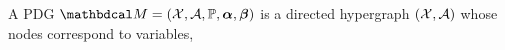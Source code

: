 \documentclass{article}
\newcommand\vjoe[1]{{\color{joecolor}\textbf{$\boldsymbol\{$Joe: }#1 \textbf{$\boldsymbol\}$}}}
\newcommand\voli[1]{{\color{olicolor}\textbf{$\boldsymbol\{$Oli: }#1 \textbf{$\boldsymbol\}$}}}
\begin{document}
\begin{defn}
    A PDG $\dg M = (\X, \Ar,
        \mathbb P, 
        \balpha, \bbeta )
    $
    is     
    a directed hypergraph 
    $(\mathcal X, \mathcal A)$ 
    whose nodes correspond to variables,

\end{defn}
\end{document}
